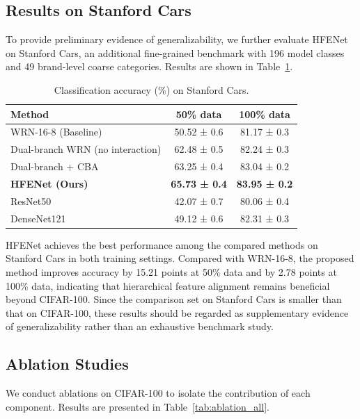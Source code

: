 \documentclass[pdflatex,sn-mathphys-num]{sn-jnl}
\theoremstyle{thmstyleone}%
\theoremstyle{thmstyletwo}%
\theoremstyle{thmstylethree}%
\begin{document}
\subsection{Results on Stanford Cars}
To provide preliminary evidence of generalizability, we further evaluate HFENet on Stanford Cars, an additional fine-grained benchmark with 196 model classes and 49 brand-level coarse categories. Results are shown in Table~\ref{tab:cars_results}.
\begin{table}[htbp]
    \centering
    \caption{Classification accuracy (\%) on Stanford Cars.}
    \label{tab:cars_results}
    \begin{tabular}{@{}lcc@{}}
    \toprule
    \textbf{Method} & \textbf{50\% data} & \textbf{100\% data} \\
    \midrule
    WRN-16-8 (Baseline) & 50.52 ± 0.6 & 81.17 ± 0.3 \\
    Dual-branch WRN (no interaction) & 62.48 ± 0.5 & 82.24 ± 0.3 \\
    Dual-branch + CBA & 63.25 ± 0.4 & 83.04 ± 0.2 \\
    \textbf{HFENet (Ours)} & \textbf{65.73 ± 0.4} & \textbf{83.95 ± 0.2} \\
    \hline
    ResNet50 & 42.07 ± 0.7 & 80.06 ± 0.4 \\
    DenseNet121 & 49.12 ± 0.6 & 82.31 ± 0.3 \\
    \bottomrule
    \end{tabular}
\end{table}
HFENet achieves the best performance among the compared methods on Stanford Cars in both training settings. 
Compared with WRN-16-8, the proposed method improves accuracy by 15.21 points at 50\% data and by 2.78 points at 100\% data, indicating that hierarchical feature alignment remains beneficial beyond CIFAR-100. 
Since the comparison set on Stanford Cars is smaller than that on CIFAR-100, these results should be regarded as supplementary evidence of generalizability rather than an exhaustive benchmark study.

\subsection{Ablation Studies}
We conduct ablations on CIFAR-100 to isolate the contribution of each component. Results are presented in Table~\ref{tab:ablation_all}.
\end{document}
